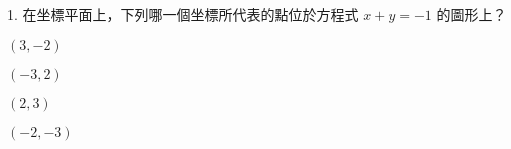 \documentclass[12pt]{article}
\begin{document}
\begin{problem}
  \item[1.] 在坐標平面上，下列哪一個坐標所代表的點位於方程式 $x + y = -1$ 的圖形上？
  \begin{choices}
    \item $(3, -2)$
    \item $(-3, 2)$
    \item $(2, 3)$
    \item $(-2, -3)$
  \end{choices}
\end{problem}
\end{document}
